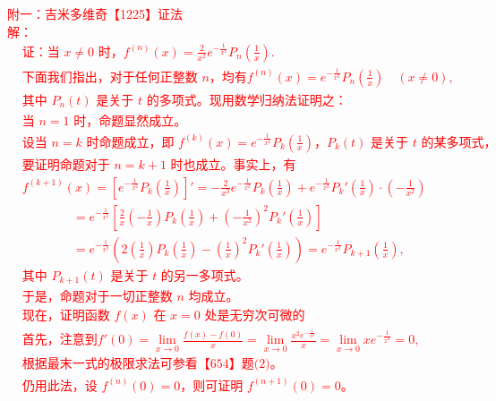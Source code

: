 \documentclass[a4paper,12pt]{article}
\begin{document}
\begin{enumerate}
    \textcolor{red}{
    附一：吉米多维奇【1225】证法\\
    解：
    \begin{align*}
        & \text{证：当 } x \neq 0 \text{ 时，} f^{(n)}(x) = \frac{2}{x^2} e^{-\frac{1}{x^2}} P_n \left( \frac{1}{x} \right). \\
        & \text{下面我们指出，对于任何正整数 } n \text{，均有} f^{(n)}(x) = e^{-\frac{1}{x^2}} P_n \left( \frac{1}{x} \right) \quad (x \neq 0),\\
        & \text{其中 } P_n(t) \text{ 是关于 } t \text{ 的多项式。现用数学归纳法证明之：} \\[0.5em]
        & \text{当 } n = 1 \text{ 时，命题显然成立。} \\
        & \text{设当 } n = k \text{ 时命题成立，即 } f^{(k)}(x) = e^{-\frac{1}{x^2}} P_k \left( \frac{1}{x} \right)，P_k(t) \text{ 是关于 } t \text{ 的某多项式，} \\
        & \text{要证明命题对于 } n = k+1 \text{ 时也成立。事实上，有} \\
        & f^{(k+1)}(x) = \left[ e^{-\frac{1}{x^2}} P_k \left( \frac{1}{x} \right) \right]' = -\frac{2}{x^3} e^{-\frac{1}{x^2}} P_k \left( \frac{1}{x} \right) + e^{-\frac{1}{x^2}} P_k' \left( \frac{1}{x} \right) \cdot \left( -\frac{1}{x^2} \right) \\
        & \qquad \qquad = e^{-\frac{1}{x^2}} \left[ \frac{2}{x} \left( -\frac{1}{x} \right) P_k \left( \frac{1}{x} \right) + \left( -\frac{1}{x^2} \right)^2 P_k' \left( \frac{1}{x} \right) \right] \\
        & \qquad \qquad = e^{-\frac{1}{x^2}} \left( 2 \left( \frac{1}{x} \right) P_k \left( \frac{1}{x} \right) - \left( \frac{1}{x} \right)^2 P_k' \left( \frac{1}{x} \right) \right) = e^{-\frac{1}{x^2}} P_{k+1} \left( \frac{1}{x} \right), \\
        & \text{其中 } P_{k+1}(t) \text{ 是关于 } t \text{ 的另一多项式。} \\[0.5em]
        & \text{于是，命题对于一切正整数 } n \text{ 均成立。} \\[0.5em]
        & \text{现在，证明函数 } f(x) \text{ 在 } x = 0 \text{ 处是无穷次可微的} \\
        & \text{首先，注意到} f'(0) = \lim_{x \to 0} \frac{f(x) - f(0)}{x} = \lim_{x \to 0} \frac{x^2 e^{-\frac{1}{x^2}}}{x} = \lim_{x \to 0} x e^{-\frac{1}{x^2}} = 0, \\[0.5em]
        & \text{根据最末一式的极限求法可参看【654】题(2)。} \\[0.5em]
        & \text{仍用此法，设 }f^{(n)}(0) = 0， \text{则可证明 } f^{(n+1)}(0) = 0。 \\

\end{align*}}
\end{enumerate}
\end{document}
